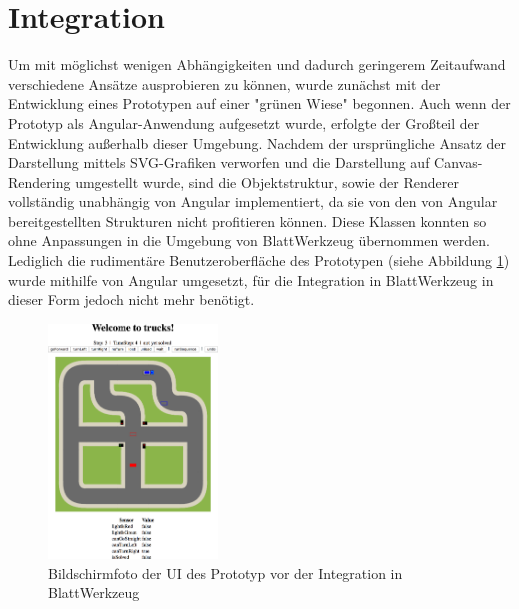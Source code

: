 \section{Integration\protect\footnotemark}
\label{sec:implementation:integration}


Um mit möglichst wenigen Abhängigkeiten und dadurch geringerem Zeitaufwand verschiedene Ansätze ausprobieren zu können, wurde zunächst mit der Entwicklung eines Prototypen auf einer "grünen Wiese" begonnen. Auch wenn der Prototyp als Angular-Anwendung aufgesetzt wurde, erfolgte der Großteil der Entwicklung außerhalb dieser Umgebung. Nachdem der ursprüngliche Ansatz der Darstellung mittels SVG-Grafiken verworfen und die Darstellung auf Canvas-Rendering umgestellt wurde, sind die Objektstruktur, sowie der Renderer vollständig unabhängig von Angular implementiert, da sie von den von Angular bereitgestellten Strukturen nicht profitieren können. Diese Klassen konnten so ohne Anpassungen in die Umgebung von BlattWerkzeug übernommen werden. Lediglich die rudimentäre Benutzeroberfläche des Prototypen (siehe Abbildung \ref{fig:implementation:integration:prototype}) wurde mithilfe von Angular umgesetzt, für die Integration in BlattWerkzeug in dieser Form jedoch nicht mehr benötigt.

\begin{figure}
  \centering
  \includegraphics[width=0.4\textwidth]{gfx/implementation-integration-prototype.png}
  \caption{Bildschirmfoto der UI des Prototyp vor der Integration in BlattWerkzeug}
  \label{fig:implementation:integration:prototype}
\end{figure}

